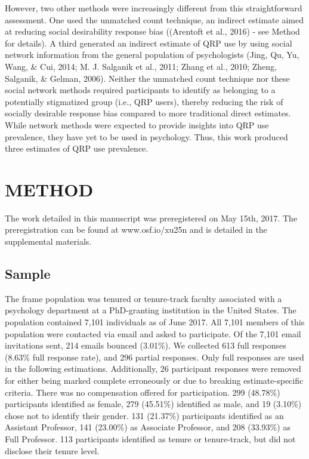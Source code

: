 \documentclass[jou]{apa6}
\theoremstyle{definition}
\theoremstyle{definition}
\theoremstyle{definition}
\theoremstyle{remark}
\begin{document}
However, two other methods were increasingly different from this
straightforward assessment. One used the unmatched count technique, an
indirect estimate aimed at reducing social desirability response bias
((Arentoft et al., 2016) - see Method for details). A third generated an
indirect estimate of QRP use by using social network information from
the general population of psychologists (Jing, Qu, Yu, Wang, \& Cui,
2014; M. J. Salganik et al., 2011; Zhang et al., 2010; Zheng, Salganik,
\& Gelman, 2006). Neither the unmatched count technique nor these social
network methods required participants to identify as belonging to a
potentially stigmatized group (i.e., QRP users), thereby reducing the
risk of socially desirable response bias compared to more traditional
direct estimates. While network methods were expected to provide
insights into QRP use prevalence, they have yet to be used in
psychology. Thus, this work produced three estimates of QRP use
prevalence.

\section{METHOD}\label{method}

The work detailed in this manuscript was preregistered on May 15th,
2017. The preregistration can be found at www.osf.io/xu25n and is
detailed in the supplemental materials.

\subsection{Sample}\label{sample}

The frame population was tenured or tenure-track faculty associated with
a psychology department at a PhD-granting institution in the United
States. The population contained 7,101 individuals as of June 2017. All
7,101 members of this population were contacted via email and asked to
participate. Of the 7,101 email invitations sent, 214 emails bounced
(3.01\%). We collected 613 full responses (8.63\% full response rate),
and 296 partial responses. Only full responses are used in the following
estimations. Additionally, 26 participant responses were removed for
either being marked complete erroneously or due to breaking
estimate-specific criteria. There was no compensation offered for
participation. 299 (48.78\%) participants identified as female, 279
(45.51\%) identified as male, and 19 (3.10\%) chose not to identify
their gender. 131 (21.37\%) participants identified as an Assistant
Professor, 141 (23.00\%) as Associate Professor, and 208 (33.93\%) as
Full Professor. 113 participants identified as tenure or tenure-track,
but did not disclose their tenure level.
\end{document}
